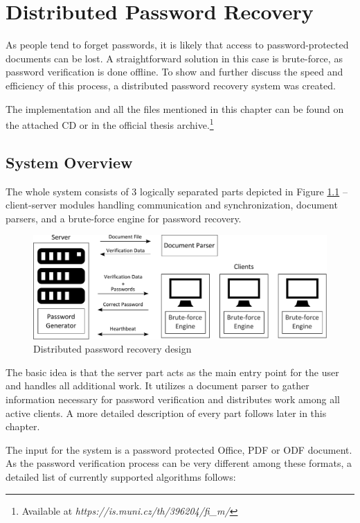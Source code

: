 \documentclass[11pt,oneside]{fithesis2}
\begin{document}
\chapter{Distributed Password Recovery}\label{ch_impl}

As people tend to forget passwords, it is likely that access to password-protected documents can be lost. A straightforward solution in this case is brute-force, as password verification is done offline. To show and further discuss the speed and efficiency of this process, a distributed password recovery system was created.

The implementation and all the files mentioned in this chapter can be found on the attached CD or in the official thesis archive.\footnote{Available at \textit{https://is.muni.cz/th/396204/fi\_m/}}

\section{System Overview}

The whole system consists of 3 logically separated parts depicted in Figure \ref{ddpbf_design} -- client-server modules handling communication and synchronization, document parsers, and a brute-force engine for password recovery.

\begin{figure}[ht]
	\centering
	\includegraphics[width=1\textwidth]{figures/ddpbf_design.pdf}
	\caption{Distributed password recovery design}
	\label{ddpbf_design}
\end{figure}

The basic idea is that the server part acts as the main entry point for the user and handles all additional work. It utilizes a document parser to gather information necessary for password verification and distributes work among all active clients. A more detailed description of every part follows later in this chapter. 

The input for the system is a password protected Office, PDF or ODF document. As the password verification process can be very different among these formats, a detailed list of currently supported algorithms follows:
\end{document}
